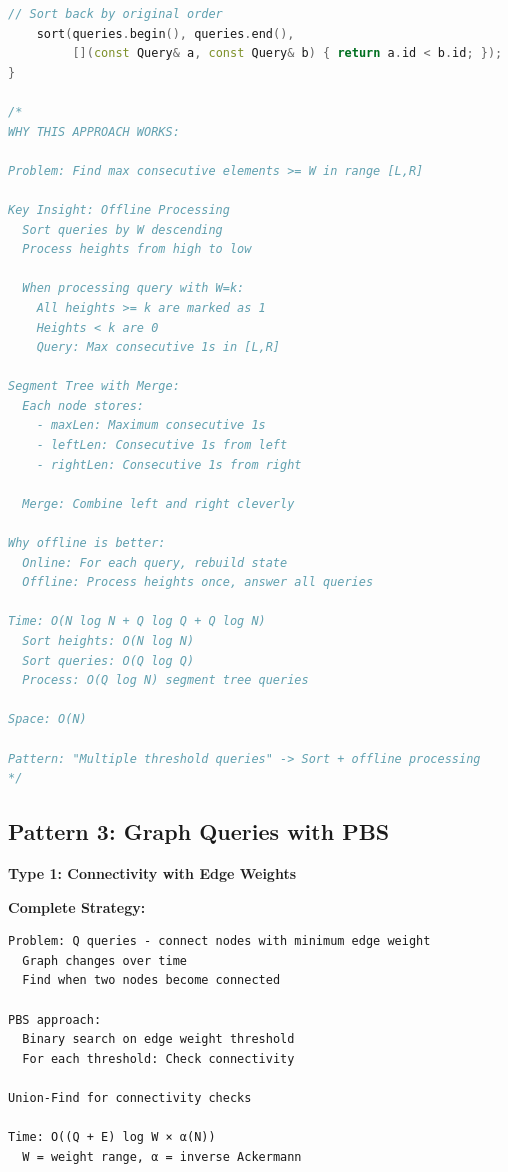 \documentclass[11pt,a4paper,oneside]{book}
\begin{document}
\begin{lstlisting}[language=C++, caption=Range Query Solutions - NEW PROBLEM]
    // Sort back by original order
    sort(queries.begin(), queries.end(), 
         [](const Query& a, const Query& b) { return a.id < b.id; });
}

/*
WHY THIS APPROACH WORKS:

Problem: Find max consecutive elements >= W in range [L,R]

Key Insight: Offline Processing
  Sort queries by W descending
  Process heights from high to low
  
  When processing query with W=k:
    All heights >= k are marked as 1
    Heights < k are 0
    Query: Max consecutive 1s in [L,R]

Segment Tree with Merge:
  Each node stores:
    - maxLen: Maximum consecutive 1s
    - leftLen: Consecutive 1s from left
    - rightLen: Consecutive 1s from right
  
  Merge: Combine left and right cleverly

Why offline is better:
  Online: For each query, rebuild state
  Offline: Process heights once, answer all queries

Time: O(N log N + Q log Q + Q log N)
  Sort heights: O(N log N)
  Sort queries: O(Q log Q)
  Process: O(Q log N) segment tree queries

Space: O(N)

Pattern: "Multiple threshold queries" -> Sort + offline processing
*/
\end{lstlisting}

\subsection{Pattern 3: Graph Queries with PBS}

\begin{tcolorbox}[
    enhanced,breakable,
    colback=warnyellow!10,
    colframe=warnyellow,
    boxrule=2pt,
    arc=4mm,
    title=\textbf{Complete Graph Query Algorithms}
]
\textbf{Type 1: Connectivity with Edge Weights}

\textbf{Complete Strategy:}
\begin{verbatim}
Problem: Q queries - connect nodes with minimum edge weight
  Graph changes over time
  Find when two nodes become connected
  
PBS approach:
  Binary search on edge weight threshold
  For each threshold: Check connectivity
  
Union-Find for connectivity checks

Time: O((Q + E) log W × α(N))
  W = weight range, α = inverse Ackermann
\end{verbatim}
\end{tcolorbox}
\end{document}
